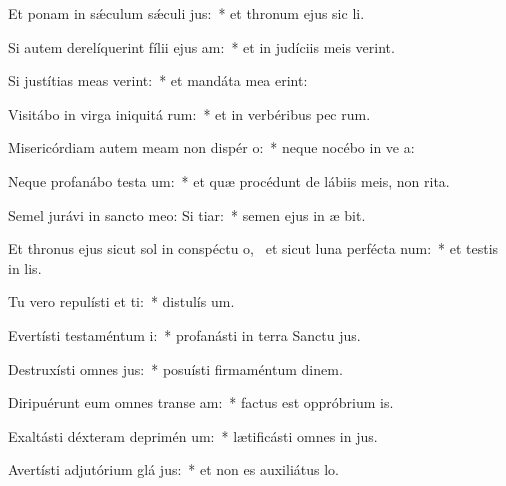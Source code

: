 \item Et ponam in sǽculum sǽculi  jus:~* et thronum ejus sic  li.
\item Si autem derelíquerint fílii ejus  am:~* et in judíciis meis  verint.
\item Si justítias meas verint:~* et mandáta mea  erint:
\item Visitábo in virga iniquitá rum:~* et in verbéribus pec rum.
\item Misericórdiam autem meam non dispér  o:~* neque nocébo in ve a:
\item Neque profanábo testa um:~* et quæ procédunt de lábiis meis, non  rita.
\item Semel jurávi in sancto meo: Si  tiar:~* semen ejus in æ bit.
\item Et thronus ejus sicut sol in conspéctu o,~\pscross{} et sicut luna perfécta  num:~* et testis in  lis.
\item Tu vero repulísti et ti:~* distulís  um.
\item Evertísti testaméntum  i:~* profanásti in terra Sanctu jus.
\item Destruxísti omnes  jus:~* posuísti firmaméntum  dinem.
\item Diripuérunt eum omnes transe am:~* factus est oppróbrium  is.
\item Exaltásti déxteram deprimén um:~* lætificásti omnes in jus.
\item Avertísti adjutórium glá jus:~* et non es auxiliátus   lo.
